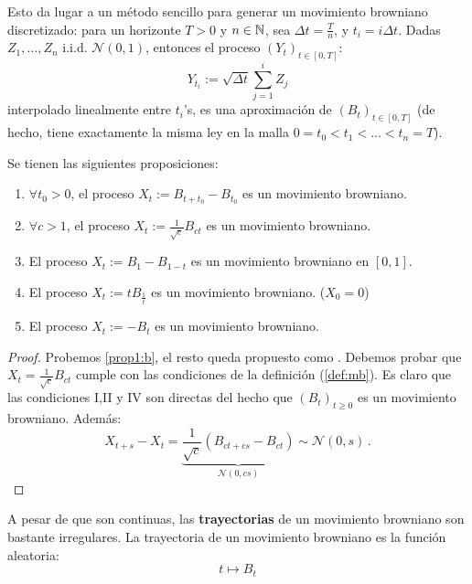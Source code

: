 Esto da lugar a un método sencillo para generar un movimiento browniano discretizado: para un horizonte $T > 0$ y $n \in \mathbb{N}$, sea $\Delta t = \frac{T}{n}$, y $t_i = i \Delta t$.  Dadas $Z_1, \ldots, Z_n$ i.i.d. $\mathcal{N}(0,1)$, entonces el proceso $(Y_{t})_{t \in [0,T]}$: 
\begin{equation*}
    Y_{t_i} := \sqrt{\Delta t} \sum_{j=1}^{i} Z_j
\end{equation*}
interpolado linealmente entre $t_i$'s, es una aproximación de $(B_t)_{t \in [0,T]}$ (de hecho, tiene exactamente la misma ley en la malla $0 = t_0 < t_1 < \ldots < t_n = T$). 

\begin{proposition}
Se tienen las siguientes proposiciones:
\begin{enumerate}
    \item \label{prop1:a} $\forall  t_0 > 0$, el proceso $X_t := B_{t + t_0} - B_{t_0}$ es un movimiento browniano.
    \item \label{prop1:b} $\forall c > 1$, el proceso $X_t := \frac{1}{\sqrt{c}} B_{ct}$ es un movimiento browniano.
    \item \label{prop1:c} El proceso $X_t := B_1 - B_{1-t}$ es un movimiento browniano en $[0,1]$.
    \item \label{prop1:d} El proceso $X_t := t B_{\frac{1}{t}}$ es un movimiento browniano. ($X_0 = 0$)
    \item \label{prop1:e} El proceso $X_t := -B_{t}$ es un movimiento browniano.
\end{enumerate}
\end{proposition}

\begin{proof}
\gris
Probemos \ref{prop1:b}, el resto queda propuesto como \ejercicio \gris. Debemos probar que $X_t = \frac{1}{\sqrt{c}} B_{ct}$ cumple con las condiciones de la definición (\ref{def:mb}). Es claro  que las condiciones I,II y IV son directas del hecho que $(B_t)_{t \geq 0}$ es un movimiento browniano. Además: 
\begin{equation*}
    X_{t+s} - X_t = \underbrace{\frac{1}{\sqrt{c} } \left( B_{ct + cs} - B_{ct} \right)}_{\mathcal{N}(0,cs)} \sim  \mathcal{N}(0,s)\,.
\end{equation*}
\findem
\negro
\end{proof}

A pesar de que son continuas, las \textbf{trayectorias} de un movimiento browniano son bastante irregulares. La trayectoria de un movimiento browniano es la función aleatoria:
\begin{equation*}
     t \mapsto B_t
\end{equation*}

